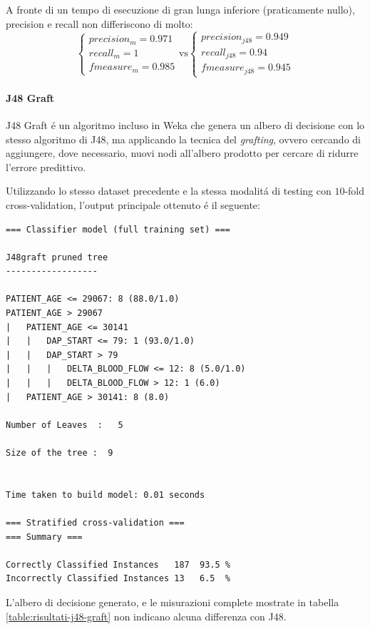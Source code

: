 \documentclass[preprint]{acm_proc_article-sp}
\begin{document}
A fronte di un tempo di esecuzione di gran lunga inferiore (praticamente nullo), precision e recall non differiscono di molto:
\[
\begin{cases}
precision_m = 0.971 \\
recall_m = 1 \\
fmeasure_m = 0.985
\end{cases}
\mbox{vs}
\begin{cases}
precision_{j48} = 0.949 \\
recall_{j48} = 0.94 \\
fmeasure_{j48} = 0.945
\end{cases}
\]

\paragraph{J48 Graft} J48 Graft \'e un algoritmo incluso in Weka che genera un albero di decisione con lo stesso algoritmo di J48, ma applicando la tecnica del \textit{grafting}\cite{Webb1999}, ovvero cercando di aggiungere, dove necessario, nuovi nodi all'albero prodotto per cercare di ridurre l'errore predittivo.

Utilizzando lo stesso dataset precedente e la stessa modalit\'a di testing con $10$-fold cross-validation, l'output principale ottenuto \'e il seguente:
\begin{verbatim}
=== Classifier model (full training set) ===

J48graft pruned tree
------------------

PATIENT_AGE <= 29067: 8 (88.0/1.0)
PATIENT_AGE > 29067
|   PATIENT_AGE <= 30141
|   |   DAP_START <= 79: 1 (93.0/1.0)
|   |   DAP_START > 79
|   |   |   DELTA_BLOOD_FLOW <= 12: 8 (5.0/1.0)
|   |   |   DELTA_BLOOD_FLOW > 12: 1 (6.0)
|   PATIENT_AGE > 30141: 8 (8.0)

Number of Leaves  :   5

Size of the tree :  9


Time taken to build model: 0.01 seconds

=== Stratified cross-validation ===
=== Summary ===

Correctly Classified Instances   187  93.5 %
Incorrectly Classified Instances 13   6.5  %
\end{verbatim}

L'albero di decisione generato, e le misurazioni complete mostrate in tabella \ref{table:risultati-j48-graft} non indicano alcuna differenza con J48.
\end{document}
